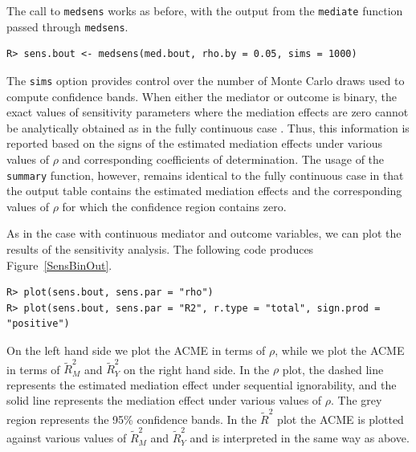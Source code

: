 \documentclass[11pt,letterpaper]{article}
\theoremstyle{plain}
\begin{document}
The call to \texttt{medsens} works as before, with the output from the \texttt{mediate}
function passed through \texttt{medsens}.
\begin{verbatim}
R> sens.bout <- medsens(med.bout, rho.by = 0.05, sims = 1000)
\end{verbatim}
The \texttt{sims} option provides control over the number of Monte Carlo draws 
used to compute confidence bands.
When either the mediator or outcome is binary, the exact values of
sensitivity parameters where the mediation effects are zero cannot be analytically
obtained as in the fully continuous case \citep[see][Section 4]{imai:keel:yama:10}.
Thus, this information is reported based on the signs of the estimated mediation
effects under various values of $\rho$ and corresponding coefficients of determination.
The usage of the \texttt{summary} function, however, remains
identical to the fully continuous case
in that the output table contains the estimated mediation
effects and the corresponding values of $\rho$ for which the
confidence region contains zero.

As in the case with continuous mediator and outcome variables, we can plot the
results of the sensitivity analysis.  The following code produces Figure~\ref{SensBinOut}.
\begin{verbatim}
R> plot(sens.bout, sens.par = "rho")
R> plot(sens.bout, sens.par = "R2", r.type = "total", sign.prod = "positive")
\end{verbatim}
On the left hand side we plot the ACME in terms of $\rho$, while we plot the ACME
in terms of $\widetilde{R}^2_M$ and $\widetilde{R}^2_Y$ on the right hand side.
In the $\rho$ plot, the dashed line represents the estimated mediation effect
under sequential
ignorability, and the solid line represents the mediation effect under
various values of $\rho$.  The grey region represents the 95\%
confidence bands. In the $\widetilde{R}^2$ plot the ACME is plotted against various values of $\widetilde{R}^2_M$ and $\widetilde{R}^2_Y$ and is interpreted in the same way as above.
\end{document}
